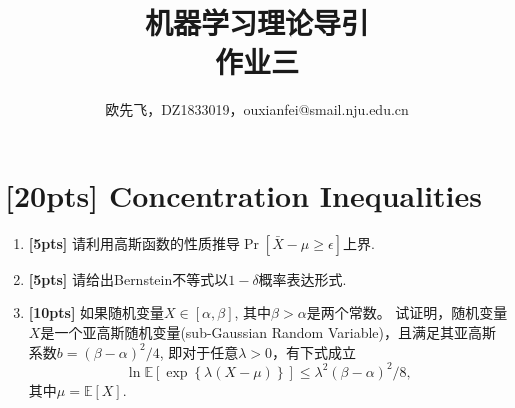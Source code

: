 \documentclass[a4paper,UTF8]{article}
\numberwithin{equation}{section}
\begin{document}
\allowdisplaybreaks
\renewcommand{\tilde}{\widetilde}
\renewcommand{\hat}{\widehat}
	\title{机器学习理论导引\\
		作业三}
	\author{欧先飞，DZ1833019，ouxianfei@smail.nju.edu.cn}
	\maketitle

\section{[20pts] Concentration Inequalities}
	\begin{enumerate}[(1)]
		\item \textbf{[5pts]}  请利用高斯函数的性质推导$\Pr[\bar{X}-\mu\geq\epsilon]$上界.
		
		\item \textbf{[5pts]}  请给出Bernstein不等式以$1-\delta$概率表达形式.
		
		\item \textbf{[10pts]} 如果随机变量$X\in[\alpha,\beta]$, 其中$\beta > \alpha$是两个常数。 试证明，随机变量$X$是一个亚高斯随机变量(sub-Gaussian Random Variable)，且满足其亚高斯系数$b=(\beta-\alpha)^2/4$, 即对于任意$\lambda > 0$，有下式成立
		\begin{equation}
			\label{eq:def-subgaussian}
			\ln \mathbb{E}[\exp\left\{\lambda (X-\mu) \right\}] \leq \lambda^2(\beta-\alpha)^2/8,
		\end{equation}
		其中$\mu = \mathbb{E}[X]$.		
	\end{enumerate}
\end{document}
